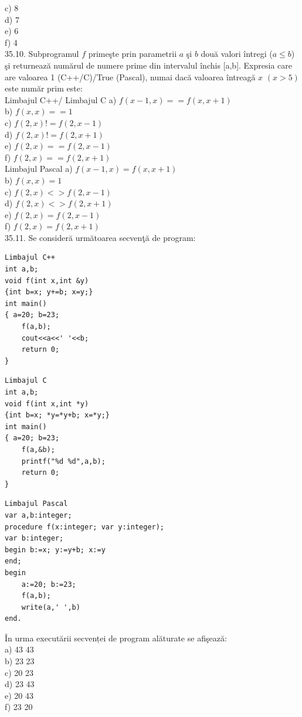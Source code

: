 \begin{itemize}
\begin{enumerate}
c) 8
\\
d) 7
\\
e) 6
\\
f) 4
\\
35.10. Subprogramul $f$ primeşte prin parametrii $a$ şi $b$ două valori întregi ($a \leq b$) şi returnează numărul de numere prime din intervalul închis [a,b]. Expresia care are valoarea 1 (C++/C)/True (Pascal), numai dacă valoarea întreagă $x$ $(x>5)$ este număr prim este:
\\
Limbajul C++/ Limbajul C
a) $f(x-1, x)==f(x, x+1)$
\\
b) $f(x, x)==1$
\\
c) $f(2, x)!=f(2, x-1)$
\\
d) $f(2, x)!=f(2, x+1)$
\\
e) $f(2, x)==f(2, x-1)$
\\
f) $f(2, x)==f(2, x+1)$
\\
Limbajul Pascal
a) $f(x-1, x)=f(x, x+1)$
\\
b) $f(x, x)=1$
\\
c) $f(2, x)<>f(2, x-1)$
\\
d) $f(2, x)<>f(2, x+1)$
\\
e) $f(2, x)=f(2, x-1)$
\\
f) $f(2, x)=f(2, x+1)$
\\
35.11. Se consideră următoarea secvenţă de program:
\begin{verbatim}
Limbajul C++
int a,b;
void f(int x,int &y)
{int b=x; y+=b; x=y;}
int main()
{ a=20; b=23;
    f(a,b);
    cout<<a<<' '<<b;
    return 0;
}
\end{verbatim}
\begin{verbatim}
Limbajul C
int a,b;
void f(int x,int *y)
{int b=x; *y=*y+b; x=*y;}
int main()
{ a=20; b=23;
    f(a,&b);
    printf("%d %d",a,b);
    return 0;
}
\end{verbatim}
\begin{verbatim}
Limbajul Pascal
var a,b:integer;
procedure f(x:integer; var y:integer);
var b:integer;
begin b:=x; y:=y+b; x:=y
end;
begin
    a:=20; b:=23;
    f(a,b);
    write(a,' ',b)
end.
\end{verbatim}
În urma executării secvenței de program alăturate se afişează:
\\
a) 43 43
\\
b) 23 23
\\
c) 20 23
\\
d) 23 43
\\
e) 20 43
\\
f) 23 20
\\

\end{enumerate}
\end{itemize}
